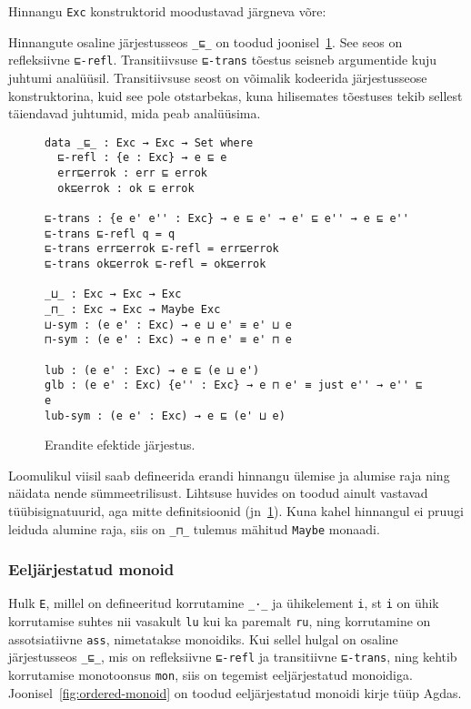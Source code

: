 \documentclass[a4paper,12pt]{article}
\begin{document}
Hinnangu {\tt Exc} konstruktorid moodustavad järgneva võre:
\begin{center}
\end{center}
Hinnangute osaline järjestusseos {\tt _⊑_} on toodud joonisel~\ref{fig:exc.ord}.
See seos on refleksiivne {\tt ⊑-refl}.
Transitiivsuse {\tt ⊑-trans} tõestus seisneb argumentide kuju juhtumi analüüsil.
Transitiivsuse seost on võimalik kodeerida järjestusseose konstruktorina, kuid see pole otstarbekas,
kuna hilisemates tõestuses tekib sellest täiendavad juhtumid, mida peab analüüsima.

\begin{figure}
  \begin{BVerbatim}
data _⊑_ : Exc → Exc → Set where
  ⊑-refl : {e : Exc} → e ⊑ e
  err⊑errok : err ⊑ errok
  ok⊑errok : ok ⊑ errok
  
⊑-trans : {e e' e'' : Exc} → e ⊑ e' → e' ⊑ e'' → e ⊑ e''
⊑-trans ⊑-refl q = q
⊑-trans err⊑errok ⊑-refl = err⊑errok
⊑-trans ok⊑errok ⊑-refl = ok⊑errok

_⊔_ : Exc → Exc → Exc
_⊓_ : Exc → Exc → Maybe Exc
⊔-sym : (e e' : Exc) → e ⊔ e' ≡ e' ⊔ e
⊓-sym : (e e' : Exc) → e ⊓ e' ≡ e' ⊓ e

lub : (e e' : Exc) → e ⊑ (e ⊔ e')
glb : (e e' : Exc) {e'' : Exc} → e ⊓ e' ≡ just e'' → e'' ⊑ e
lub-sym : (e e' : Exc) → e ⊑ (e' ⊔ e)
  \end{BVerbatim}
  \caption{Erandite efektide järjestus.}
  \label{fig:exc.ord}
\end{figure}
Loomulikul viisil saab defineerida erandi hinnangu ülemise ja alumise raja ning näidata nende sümmeetrilisust.
Lihtsuse huvides on toodud ainult vastavad tüübisignatuurid, aga mitte definitsioonid (jn~\ref{fig:exc.ord}).
Kuna kahel hinnangul ei pruugi leiduda alumine raja, siis on {\tt _⊓_} tulemus mähitud {\tt Maybe} monaadi.

\subsubsection{Eeljärjestatud monoid}
Hulk {\tt E}, millel on defineeritud korrutamine {\tt _·_} ja ühikelement {\tt i},
st {\tt i} on ühik korrutamise suhtes nii vasakult {\tt lu} kui ka paremalt {\tt ru},
ning korrutamine on assotsiatiivne {\tt ass}, nimetatakse monoidiks.
Kui sellel hulgal on osaline järjestusseos {\tt _⊑_},
mis on refleksiivne {\tt ⊑-refl} ja transitiivne {\tt ⊑-trans},
ning kehtib korrutamise monotoonsus {\tt mon},
siis on tegemist eeljärjestatud monoidiga.
Joonisel~\ref{fig:ordered-monoid} on toodud eeljärjestatud monoidi kirje tüüp Agdas.
\end{document}
